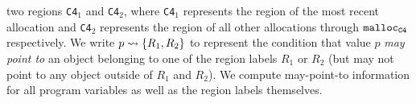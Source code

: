two regions {\tt C4}$_1$ and {\tt C4}$_2$, where {\tt C4}$_1$ represents the region of the most recent allocation and {\tt C4}$_2$
represents the region of all other allocations through ${\tt malloc_{C4}}$ respectively.
We write $p\rightsquigarrow\{R_1,R_2\}$ to represent the condition that value $p$ {\em may point to}
an object belonging to one of the region labels $R_1$ or $R_2$ (but
may not point to any object outside of $R_1$ and $R_2$). We compute may-point-to information for
all program variables as well as the region labels themselves.


